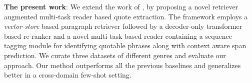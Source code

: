 \fi
\noindent\textbf{The present work}: We extend the work of \citet{maclaughlin2021context}, by proposing a novel retriever augmented multi-task reader based quote extraction. The framework employs a \textit{vector-store} based paragraph retriever followed by a decoder-only transformer based re-ranker and a novel multi-task based reader containing a sequence tagging module for identifying quotable phrases along with context aware span prediction. We curate three datasets of different genres and evaluate our approach. Our method outperforms all the previous baselines and generalizes better in a cross-domain few-shot setting.